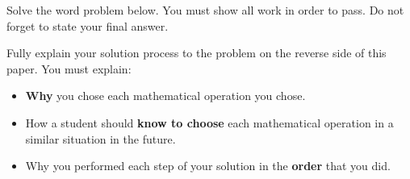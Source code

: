 
Solve the word problem below. You must show all work in order to pass. Do not forget to state your final answer.

\begin{statement}
\end{statement}

\begin{ansenv}
    \vspace{12pt}
\end{ansenv}

\newpage
{}

Fully explain your solution process to the problem on the reverse side of this paper. You must explain:
\begin{itemize}
    \item \textbf{Why} you chose each mathematical operation you chose.
    \item How a student should \textbf{know to choose} each mathematical operation in a similar situation in the future.
    \item Why you performed each step of your solution in the \textbf{order} that you did.
\end{itemize}